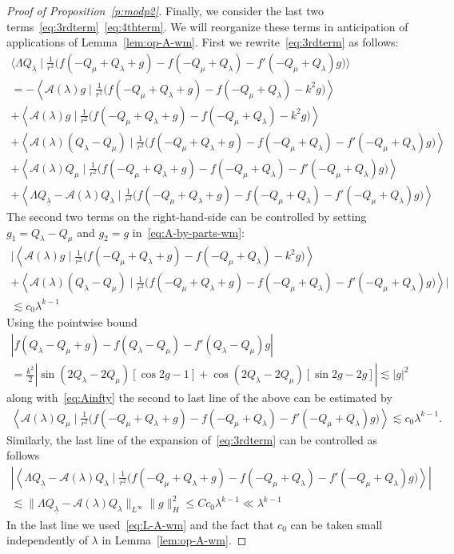 \documentclass[10pt,reqno]{amsart}
\newcommand{\uln}[1]{{\underline{ #1 }}}
\newcommand{\A}{\mathcal{A}}
\newcommand{\la}{\lambda}
\newcommand{\La}{\Lambda}
\newcommand{\ang}[1]{\left\langle{#1}\right\rangle}
\newcommand{\abs}[1]{\left\lvert{#1}\right\rvert}
\newcommand{\EQ}[1]{\begin{equation}\begin{split} #1 \end{split}\end{equation}}
\numberwithin{equation}{section}
\theoremstyle{remark}
\newcounter{parts}
\newcommand{\ula}{\underline{\lambda}}
\newcommand{\0}{\emptyset}
\begin{document}
\begin{proof}[Proof of Proposition~\ref{p:modp2}]
Finally, we consider the last two terms~\eqref{eq:3rdterm}~\eqref{eq:4thterm}. We will reorganize these terms in anticipation of applications of Lemma~\ref{lem:op-A-wm}. First we rewrite~\eqref{eq:3rdterm} as follows: 
\begin{multline}
\Big\langle \Lambda Q_\uln\lambda \mid
\frac{1}{r^2}\big(f({-}Q_\mu + Q_\lambda + g) - f({-}Q_\mu + Q_\lambda) - f'({-}Q_\mu + Q_\lambda)g\big)\Big\rangle \\ 
=  -  \ang{ \A(\la) g \mid \frac{1}{r^2}\big(f({-}Q_\mu + Q_\lambda + g) - f({-}Q_\mu + Q_\lambda) -k^2g\big)} \\
+\ang{ \A(\la) g \mid \frac{1}{r^2}\big(f({-}Q_\mu + Q_\lambda + g) - f({-}Q_\mu + Q_\lambda) -k^2g\big)} \\
+\ang{ \A(\la)  (Q_\la- Q_\mu) \mid \frac{1}{r^2}\big(f({-}Q_\mu + Q_\lambda + g) - f({-}Q_\mu + Q_\lambda) - f'({-}Q_\mu + Q_\lambda)g\big)}  \\
+ \ang{ \A(\la) Q_\mu \mid \frac{1}{r^2}\big(f({-}Q_\mu + Q_\lambda + g) - f({-}Q_\mu + Q_\lambda) - f'({-}Q_\mu + Q_\lambda)g\big)}  \\
+ \ang{ \La Q_{\ula} - \A(\la)  Q_\la  \mid  \frac{1}{r^2}\big(f({-}Q_\mu + Q_\lambda + g) - f({-}Q_\mu + Q_\lambda) - f'({-}Q_\mu + Q_\lambda)g\big)}
\end{multline}
The second two terms on the right-hand-side can be controlled by setting  $g_1 = Q_{\la} - Q_\mu$ and $g_2 = g$ in~\eqref{eq:A-by-parts-wm}: 
\begin{multline}
\bigg|\ang{ \A(\la) g \mid \frac{1}{r^2}\big(f({-}Q_\mu + Q_\lambda + g) - f({-}Q_\mu + Q_\lambda) -k^2g\big)} 
\\ +\ang{ \A(\la)  (Q_\la- Q_\mu) \mid \frac{1}{r^2}\big(f({-}Q_\mu + Q_\lambda + g) - f({-}Q_\mu + Q_\lambda) - f'({-}Q_\mu + Q_\lambda)g\big)} \bigg| \\
 \lesssim c_0 \la^{k-1}
\end{multline}
Using  the pointwise bound
\begin{multline}
\abs{ f(Q_\la - Q_\mu + g) - f(Q_\la - Q_\mu) - f'(Q_\la - Q_\mu) g }  \\
= \frac{k^2}{2}\abs{ \sin(2Q_\la - 2Q_\mu)[ \cos 2 g - 1] + \cos(2Q_\la - 2Q_\mu)[ \sin 2g -2 g]} 
\lesssim \abs{g}^2
\end{multline} 
along with~\eqref{eq:Ainfty} the second to last line of the above can be estimated by 
\EQ{
 \ang{ \A(\la) Q_\mu \mid \frac{1}{r^2}\big(f({-}Q_\mu + Q_\lambda + g) - f({-}Q_\mu + Q_\lambda) - f'({-}Q_\mu + Q_\lambda)g\big)}  \lesssim c_0 \la^{k-1}.
}
Similarly, the last line of the expansion of~\eqref{eq:3rdterm} can be controlled as follows 
\begin{multline}
\abs{\ang{ \La Q_{\ula} - \A(\la)  Q_\la  \mid  \frac{1}{r^2}\big(f({-}Q_\mu + Q_\lambda + g) - f({-}Q_\mu + Q_\lambda) - f'({-}Q_\mu + Q_\lambda)g\big)}}
\\ \lesssim \|\La Q_{\ula} - \A(\la)  Q_\la \|_{L^\infty} \| g\|^2_H  \le Cc_0 \la^{k-1} \ll \la^{k-1}
\end{multline} 
In the last line we used~\eqref{eq:L-A-wm} and the fact that $c_0$ can be taken small independently of $\la$ in Lemma~\ref{lem:op-A-wm}. 


\end{proof}
\end{document}

